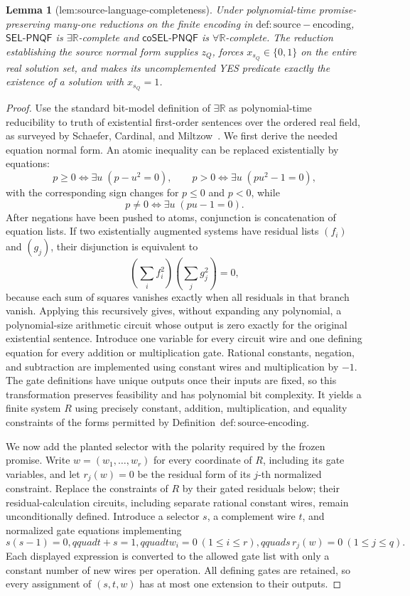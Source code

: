 \documentclass{article}
\newtheorem{lemma}{Lemma}
\begin{document}
\begin{lemma}[lem:source-language-completeness]\label{lem:source-language-completeness}
Under polynomial-time promise-preserving many-one reductions on the finite encoding in \(\mathrm{def:source-encoding}\), \(\mathsf{SEL\mbox{-}PNQF}\) is \(\exists\mathbb R\)-complete and \(\mathsf{coSEL\mbox{-}PNQF}\) is \(\forall\mathbb R\)-complete. The reduction establishing the source normal form supplies \(z_Q\), forces \(x_{s_Q}\in\{0,1\}\) on the entire real solution set, and makes its uncomplemented YES predicate exactly the existence of a solution with \(x_{s_Q}=1\).
\end{lemma}
\begin{proof}
Use the standard bit-model definition of \(\exists\mathbb R\) as polynomial-time reducibility to truth of existential first-order sentences over the ordered real field, as surveyed by Schaefer, Cardinal, and Miltzow~\cite{SchaeferCardinalMiltzow2024}.  We first derive the needed equation normal form.  An atomic inequality can be replaced existentially by equations:
\[
p\ge0\Longleftrightarrow \exists u\;(p-u^2=0),\qquad
p>0\Longleftrightarrow \exists u\;(pu^2-1=0),
\]
with the corresponding sign changes for \(p\le0\) and \(p<0\), while
\[
p\ne0\Longleftrightarrow \exists u\;(pu-1=0).
\]
After negations have been pushed to atoms, conjunction is concatenation of equation lists.  If two existentially augmented systems have residual lists \((f_i)\) and \((g_j)\), their disjunction is equivalent to
\[
\left(\sum_i f_i^2\right)\left(\sum_j g_j^2\right)=0,
\]
because each sum of squares vanishes exactly when all residuals in that branch vanish.  Applying this recursively gives, without expanding any polynomial, a polynomial-size arithmetic circuit whose output is zero exactly for the original existential sentence.  Introduce one variable for every circuit wire and one defining equation for every addition or multiplication gate.  Rational constants, negation, and subtraction are implemented using constant wires and multiplication by \(-1\).  The gate definitions have unique outputs once their inputs are fixed, so this transformation preserves feasibility and has polynomial bit complexity.  It yields a finite system \(R\) using precisely constant, addition, multiplication, and equality constraints of the forms permitted by Definition~\(\mathrm{def:source\mbox{-}encoding}\).

We now add the planted selector with the polarity required by the frozen promise.  Write \(w=(w_1,\ldots,w_r)\) for every coordinate of \(R\), including its gate variables, and let \(r_j(w)=0\) be the residual form of its \(j\)-th normalized constraint.  Replace the constraints of \(R\) by their gated residuals below; their residual-calculation circuits, including separate rational constant wires, remain unconditionally defined.  Introduce a selector \(s\), a complement wire \(t\), and normalized gate equations implementing
\[
s(s-1)=0,qquad t+s=1,qquad tw_i=0\ (1\le i\le r),qquad s\,r_j(w)=0\ (1\le j\le q).
\]
Each displayed expression is converted to the allowed gate list with only a constant number of new wires per operation.  All defining gates are retained, so every assignment of \((s,t,w)\) has at most one extension to their outputs.


\end{proof}
\end{document}
